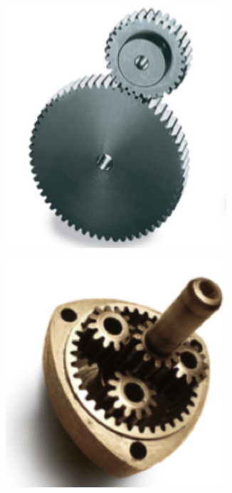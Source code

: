 \documentclass[10pt,fleqn]{article} %
\begin{document}
\begin{figure}[h]
  \centering
  \begin{subfigure}{0.25\textwidth}
    \centering
    \includegraphics[width=0.9\textwidth,height=.1\textheight,keepaspectratio]{images/engr_droit}
    \caption{}
  \end{subfigure}\hfill
  \begin{subfigure}{.25\textwidth}
    \centering
    \includegraphics[width=0.9\textwidth,height=.1\textheight,keepaspectratio]{images/engr_epi}

\end{subfigure}
\end{figure}
\end{document}
